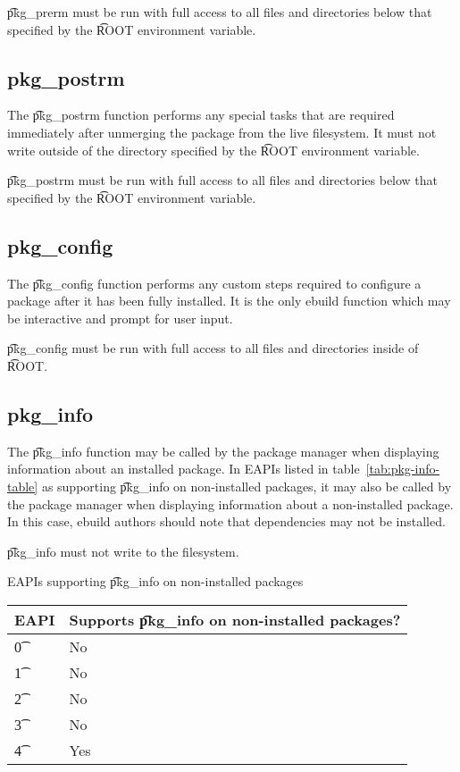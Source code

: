 \t{pkg\_prerm} must be run with full access to all files and directories below that specified by
the \t{ROOT} environment variable.

\subsection{pkg\_postrm}
\label{sec:pkg-postrm-function}

The \t{pkg\_postrm} function performs any special tasks that are required immediately after
unmerging the package from the live filesystem. It must not write outside of the directory specified
by the \t{ROOT} environment variable.

\t{pkg\_postrm} must be run with full access to all files and directories below that specified by
the \t{ROOT} environment variable.

\subsection{pkg\_config}
\label{sec:pkg-config-function}

The \t{pkg\_config} function performs any custom steps required to configure a package after it has been
fully installed. It is the only ebuild function which may be interactive and prompt for user input.

\t{pkg\_config} must be run with full access to all files and directories inside of \t{ROOT}.

\subsection{pkg\_info}
\label{sec:pkg-info-function}

 The \t{pkg\_info} function may be called by the package manager when
displaying information about an installed package. In EAPIs listed in table~\ref{tab:pkg-info-table}
as supporting \t{pkg\_info} on non-installed packages, it may also be called by the package manager
when displaying information about a non-installed package. In this case, ebuild authors should note
that dependencies may not be installed.

\t{pkg\_info} must not write to the filesystem.

\begin{centertable}{EAPIs supporting \t{pkg\_info} on non-installed packages} \label{tab:pkg-info-table}
    \begin{tabular}{ l l }
        \toprule
        \multicolumn{1}{c}{\textbf{EAPI}} &
        \multicolumn{1}{c}{\textbf{Supports \t{pkg\_info} on non-installed packages?}} \\
        \midrule
    \t{0} & No \\
    \t{1} & No \\
    \t{2} & No \\
    \t{3} & No \\
    \t{4} & Yes \\
    \bottomrule
    \end{tabular}
\end{centertable}

